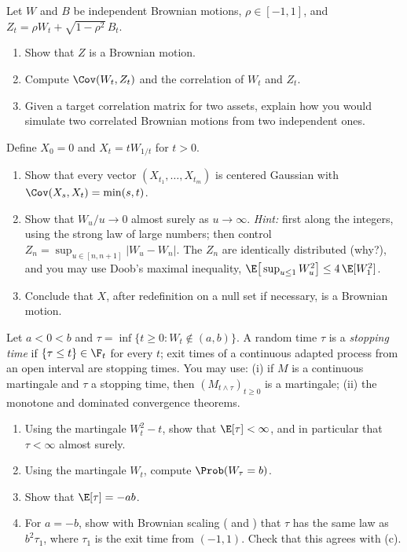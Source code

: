 \begin{exercise}\label{ex:bm-correlated}
\easy Let $W$ and $B$ be independent Brownian motions, $\rho\in[-1,1]$, and
$Z_t=\rho W_t+\sqrt{1-\rho^2}\,B_t$.
\begin{enumerate}[label=(\alph*)]
  \item Show that $Z$ is a Brownian motion.
  \item Compute $\Cov(W_t,Z_t)$ and the correlation of $W_t$ and $Z_t$.
  \item Given a target correlation matrix for two assets, explain how you would simulate
    two correlated Brownian motions from two independent ones.
\end{enumerate}
\end{exercise}

\begin{exercise}\label{ex:bm-inversion}
\medium Define $X_0=0$ and $X_t=tW_{1/t}$ for $t>0$.
\begin{enumerate}[label=(\alph*)]
  \item Show that every vector $(X_{t_1},\dots,X_{t_m})$ is centered Gaussian with
    $\Cov(X_s,X_t)=\min(s,t)$.
  \item Show that $W_u/u\to0$ almost surely as $u\to\infty$. \emph{Hint:} first along the
    integers, using the strong law of large numbers; then control
    $Z_n=\sup_{u\in[n,n+1]}|W_u-W_n|$. The $Z_n$ are identically distributed (why?), and
    you may use Doob's maximal inequality, $\E\big[\sup_{u\le1}W_u^2\big]\le4\,\E[W_1^2]$.
  \item Conclude that $X$, after redefinition on a null set if necessary, is a Brownian
    motion.
\end{enumerate}
\end{exercise}

\begin{exercise}\label{ex:bm-exit}
\medium Let $a<0<b$ and $\tau=\inf\{t\ge0:W_t\notin(a,b)\}$. A random time $\tau$ is a
\emph{stopping time} if $\{\tau\le t\}\in\F_t$ for every $t$; exit times of a continuous
adapted process from an open interval are stopping times. You may use: (i) if $M$ is a
continuous martingale and $\tau$ a stopping time, then $(M_{t\wedge\tau})_{t\ge0}$ is a
martingale; (ii) the monotone and dominated convergence theorems.
\begin{enumerate}[label=(\alph*)]
  \item Using the martingale $W_t^2-t$, show that $\E[\tau]<\infty$, and in particular
    that $\tau<\infty$ almost surely.
  \item Using the martingale $W_t$, compute $\Prob(W_\tau=b)$.
  \item Show that $\E[\tau]=-ab$.
  \item For $a=-b$, show with Brownian scaling ( and
    ) that $\tau$ has the same law as $b^2\tau_1$, where
    $\tau_1$ is the exit time from $(-1,1)$. Check that this agrees with (c).
\end{enumerate}
\end{exercise}

